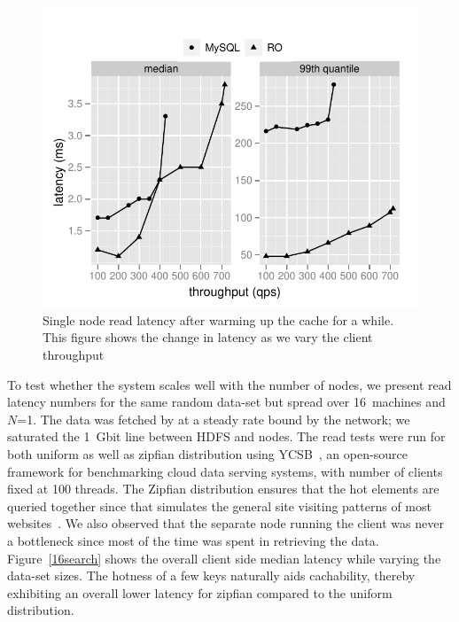 \begin{figure}
  \centering
    \includegraphics[scale=0.55]{images/mysql_vs_read.pdf}
  \caption{Single node read latency after warming up the cache for a while. This figure shows the change in latency as we vary the client throughput}
  \label{mysql:search}
\end{figure}

To test whether the system scales well with the number of nodes, we
present read latency numbers for the same random data-set but spread
over 16~machines and $N$=1. The data was fetched by \projectname{} at a steady
rate bound by the network; we saturated the 1~Gbit line between HDFS
and \projectname{} nodes. The read tests were run for both uniform as well as
zipfian distribution using YCSB~\cite{ycsb}, an open-source framework 
for benchmarking cloud data serving systems, with number of clients fixed
at 100 threads. The Zipfian distribution ensures that the hot elements are 
queried together since that simulates the general site visiting patterns 
of most websites~\cite{zipf}. We also observed that the separate node
running the client was never a bottleneck since most of the time was
spent in retrieving the data.
Figure~\ref{16search} shows the overall client side median latency while varying 
the data-set sizes. The hotness of a few keys naturally aids cachability, 
thereby exhibiting an overall lower latency for zipfian compared to 
the uniform distribution. 

